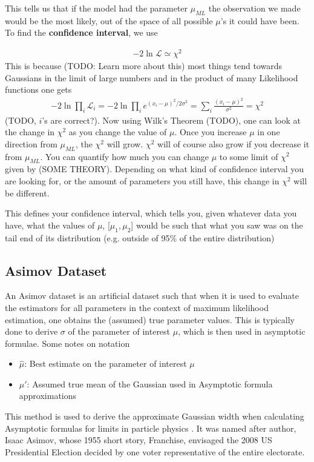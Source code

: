
This tells us that if the model had the parameter $\mu_{ML}$ the observation we made would be the most likely, out of the space of all possible $\mu$'s it could have been. To find the \textbf{confidence interval}, we use

\begin{align}
-2\ln\mathcal{L} \simeq \chi^2
\end{align}
This is because (TODO: Learn more about this) most things tend towards Gaussians in the limit of large numbers and in the product of many Likelihood functions one gets
\begin{align}
	-2\ln\prod_i\mathcal{L}_i = -2\ln\prod_i e^{(x_i-\mu)^2/2\sigma^2} = \sum_i\frac{(x_i-\mu)^2}{\sigma^2} = \chi^2
\end{align}
(TODO, $i$'s are correct?). Now using Wilk's Theorem (TODO), one can look at the change in $\chi^2$ as you change the value of $\mu$. Once you increase $\mu$ in one direction from $\mu_{ML}$, the $\chi^2$ will grow. $\chi^2$ will of course also grow if you decrease it from $\mu_{ML}$. You can quantify how much you can change $\mu$ to some limit of $\chi^2$ given by (SOME THEORY). Depending on what kind of confidence interval you are looking for, or the amount of parameters you still have, this change in $\chi^2$ will be different. 

This defines your confidence interval, which tells you, given whatever data you have, what the values of $\mu$,  [$\mu_1, \mu_2$] would be such that what you saw was on the tail end of its distribution (e.g. outside of 95\% of the entire distribution)

\subsection{Asimov Dataset}
An Asimov dataset is an artificial dataset such that when it is used to evaluate the estimators for all parameters in the context of maximum likelihood estimation, one obtains the (assumed) true parameter values. This is typically done to derive $\sigma$ of the parameter of interest $\mu$, which is then used in asymptotic formulae. Some notes on notation
\begin{itemize}
	\item $\hat{\mu}$: Best estimate on the parameter of interest $\mu$
	\item $\mu'$: Assumed true mean of the Gaussian used in Asymptotic formula approximations
\end{itemize}
This method is used to derive the approximate Gaussian width when calculating Asymptotic formulas for limits in particle physics \cite{cowan}. It was named after author, Isaac Asimov, whose 1955 short story, Franchise, envisaged the 2008 US Presidential Election decided by one voter representative of the entire electorate.



